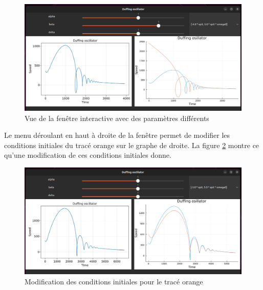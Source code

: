 \documentclass[a4paper, french, 12pt, titlepage]{article}
\begin{document}
\begin{figure}[H]
  \includegraphics[width=\linewidth]{interactivewindow_3.png}
  \caption{Vue de la fenêtre interactive avec des paramètres différents}
  \label{fig:fig4}
\end{figure}


Le menu déroulant en haut à droite de la fenêtre permet de modifier les conditions initiales du tracé orange sur le graphe de droite.
La figure \ref{fig:fig5} montre ce qu'une modification de ces conditions initiales donne. 

\begin{figure}[H]
  \includegraphics[width=\linewidth]{interactivewindow_4.png}
  \caption{Modification des conditions initiales pour le tracé orange}
  \label{fig:fig5}
\end{figure}
\end{document}
